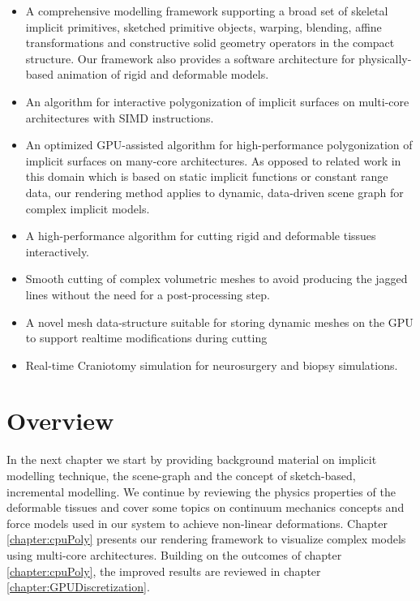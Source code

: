 \begin{itemize}
 \item A comprehensive modelling framework supporting a broad set of skeletal implicit primitives, 
 sketched primitive objects, warping, blending, affine transformations and constructive solid geometry 
 operators in the compact \blob structure. Our framework also provides a software architecture for 
 physically-based animation of rigid and deformable models.
 
 \item An algorithm for interactive polygonization of implicit surfaces on multi-core architectures with 
 SIMD instructions. %
 
 \item An optimized GPU-assisted algorithm for high-performance polygonization of implicit surfaces 
 on many-core architectures. As opposed to related work in this domain which is based on static implicit
 functions or constant range data, our rendering method applies to dynamic, data-driven \blob scene graph
 for complex implicit models. 
  
 \item A high-performance algorithm for cutting rigid and deformable tissues interactively. 
 
 \item Smooth cutting of complex volumetric meshes to avoid producing the jagged lines without the 
 need for a post-processing step.

 \item A novel mesh data-structure suitable for storing dynamic meshes on the GPU to support realtime 
 modifications during cutting
 
\item Real-time Craniotomy simulation for neurosurgery and biopsy simulations.

\end{itemize}


\section{Overview}
In the next chapter we start by providing background material on implicit modelling technique, the 
\blob scene-graph and the concept of sketch-based, incremental modelling.
We continue by reviewing the physics properties of the deformable tissues and cover some topics on 
continuum mechanics concepts and force models used in our system to achieve non-linear deformations. 
Chapter \ref{chapter:cpuPoly} presents our rendering framework to visualize complex \blob models using 
multi-core architectures. Building on the outcomes of chapter \ref{chapter:cpuPoly}, the improved results 
are reviewed in chapter \ref{chapter:GPUDiscretization}. 

